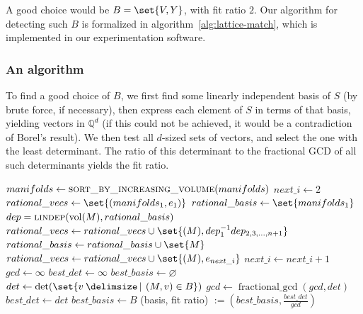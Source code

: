 \documentclass[10pt]{amsart}
\numberwithin{equation}{theorem}
\theoremstyle{definition}
\providecommand\given{}
\newcommand\SetSymbol[1][]{%
  \nonscript\:#1\,\vert\,\allowbreak\nonscript\:\mathopen{}}
\renewcommand\given{\SetSymbol[\delimsize]}
\renewcommand\given{\SetSymbol[\delimsize]}
\begin{document}
A good choice would be $B = \set{V, Y}$, with fit ratio
$2$.  Our algorithm for detecting such $B$ is formalized in
algorithm~\ref{alg:lattice-match}, which is implemented in our
experimentation software.

\subsubsection{An algorithm}

To find a good choice of $B$, we first find some linearly independent
basis of $S$ (by brute force, if necessary), then express each element
of $S$ in terms of that basis, yielding vectors in $\mathbb{Q}^d$
(if this could not be achieved, it would be a contradiction of Borel's
result). We then test all $d$-sized sets of vectors, and select the one
with the least determinant. The ratio of this determinant to the
fractional GCD of all such determinants yields the fit ratio.

\begin{algorithm}
  \caption{Best-fit lattice matching algorithm.}
  \label{alg:lattice-match}
  \begin{algorithmic}
    \State $manifolds \gets \Call{sort\_by\_increasing\_volume}{manifolds}$
    \State $next\_i \gets 2$ 
    \State $rational\_vecs \gets \set{(manifolds_1, e_1)}$
    \State $rational\_basis \gets \set{manifolds_1}$
      \State $dep = \Call{lindep}{\vol(M),rational\_basis}$
           \State $rational\_vecs \gets rational\_vecs \cup \set{(M), dep_1^{-1}
                   dep_{2,3,\dotsc,n+1}}$
        \Else
             \State \Return {}
           \EndIf
           \State $rational\_basis \gets rational\_basis \cup \set{M}$
           \State $rational\_vecs \gets rational\_vecs \cup \set{(M),e_{next\_i}}$
           \State $next\_i \gets next\_i + 1$
        \EndIf
      \EndIf
    \EndFor
    \State $gcd \gets \infty$
    \State $best\_det \gets \infty$
    \State $best\_basis \gets \varnothing$
      \State $det \gets \det(\set{v \given (M,v) \in B})$
        \State $gcd \gets \operatorname{fractional\_gcd}(gcd, det)$
          \State $best\_det \gets det$
          \State $best\_basis \gets B$
        \EndIf
      \EndIf
    \EndFor
    \State \Return (basis, fit ratio) $:=(best\_basis, \frac{best\_det}{gcd})$
  \end{algorithmic}
\end{algorithm}
\end{document}
